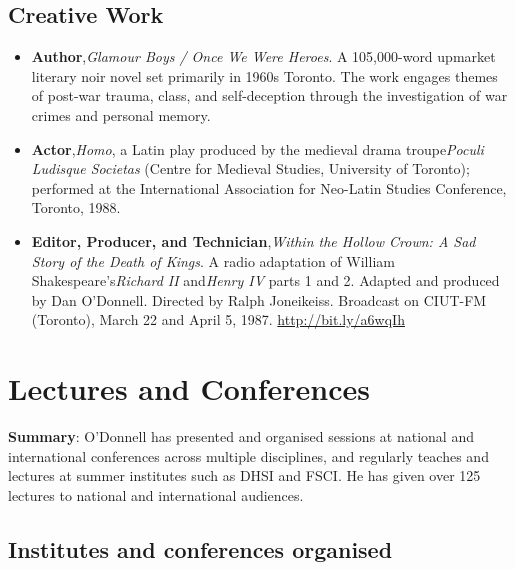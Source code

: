 \documentclass[12pt]{article}
\begin{document}
\subsection*{Creative Work}

\begin{itemize}
  \item \textbf{Author},\textit{Glamour Boys / Once We Were Heroes}. A 105,000-word upmarket literary noir novel set primarily in 1960s Toronto. The work engages themes of post-war trauma, class, and self-deception through the investigation of war crimes and personal memory.
  \item \textbf{Actor},\textit{Homo}, a Latin play produced by the medieval drama troupe\textit{Poculi Ludisque Societas} (Centre for Medieval Studies, University of Toronto); performed at the International Association for Neo-Latin Studies Conference, Toronto, 1988.
  \item \textbf{Editor, Producer, and Technician},\textit{Within the Hollow Crown: A Sad Story of the Death of Kings}. A radio adaptation of William Shakespeare’s\textit{Richard II} and\textit{Henry IV} parts 1 and 2. Adapted and produced by Dan O’Donnell. Directed by Ralph Joneikeiss. Broadcast on CIUT-FM (Toronto), March 22 and April 5, 1987. \url{http://bit.ly/a6wqIh}
\end{itemize}


\section*{Lectures and Conferences}
\textbf{Summary}: O'Donnell has presented and organised sessions at national and international conferences across multiple disciplines, and regularly teaches and lectures at summer institutes such as DHSI and FSCI. He has given over 125 lectures to national and international audiences.


\subsection*{Institutes and conferences organised}
\end{document}
